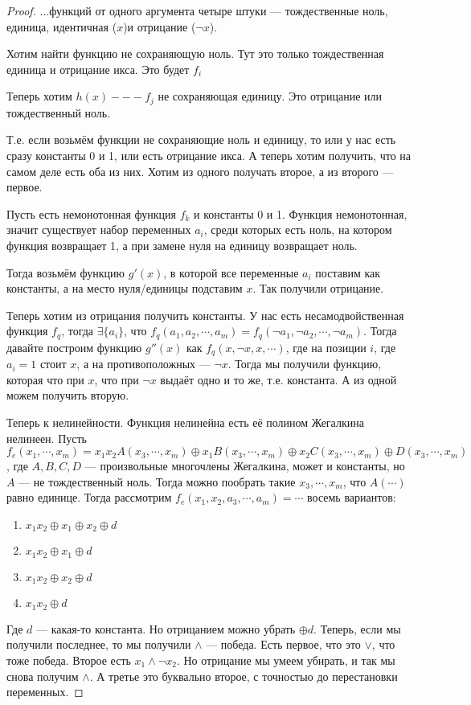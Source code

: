 \begin{proof}
	...функций от одного аргумента четыре штуки --- тождественные ноль, единица, идентичная ($x$)и отрицание ($\lnot x$).

	Хотим найти функцию не сохраняющую ноль. Тут это только тождественная единица и отрицание икса. Это будет $f_i$

	Теперь хотим $h(x) --- f_j$ не сохраняющая единицу. Это отрицание или тождественный ноль. 

	Т.е. если возьмём функции не сохраняющие ноль и единицу, то или у нас есть сразу константы 0 и 1, или есть отрицание икса.  А теперь хотим получить, что на самом деле есть оба из них. Хотим из одного получать второе, а из второго --- первое.

	Пусть есть немонотонная функция $f_k$ и константы 0 и 1. Функция немонотонная, значит существует набор переменных $a_i$, среди которых есть ноль, на котором функция возвращает 1, а при замене нуля на единицу возвращает ноль. 

	Тогда возьмём функцию $g'(x)$, в которой все переменные $a_i$ поставим как константы, а на место нуля/единицы подставим $x$. Так получили отрицание.

	Теперь хотим из отрицания получить константы. У нас есть несамодвойственная функция $f_q$, тогда $\exists \{a_i\}$, что $f_q(a_1, a_2, \cdots, a_m) = f_q(\lnot a_1, \lnot a_2, \cdots, \lnot a_m)$. Тогда давайте построим функцию $g''(x)$ как $f_q(x, \lnot x, x, \cdots)$, где на позиции $i$, где $a_i = 1$ стоит $x$, а на противоположных --- $\lnot x$. Тогда мы получили функцию, которая что при $x$, что при $\lnot x$ выдаёт одно и то же, т.е. константа. А из одной можем получить вторую.

	Теперь к нелинейности. Функция нелинейна есть её полином Жегалкина нелинеен. Пусть $f_e(x_1, \cdots, x_m) = x_1 x_2 A(x_3, \cdots, x_m) \oplus x_1 B(x_3, \cdots, x_m) \oplus x_2 C(x_3, \cdots, x_m) \oplus D(x_3, \cdots, x_m) $, где $A, B, C, D$ --- произвольные многочлены Жегалкина, может и константы, но $A$ --- не тождественный ноль. Тогда можно пообрать такие $x_3, \cdots, x_m$, что $A(\cdots)$ равно единице. Тогда рассмотрим $f_e(x_1, x_2, a_3, \cdots, a_m) = \cdots$ восемь вариантов: 

	\begin{enumerate}
		\item{$x_1 x_2 \oplus x_1 \oplus x_2 \oplus d$}
		\item{$x_1 x_2 \oplus x_1 \oplus d$}
		\item{$x_1 x_2 \oplus x_2 \oplus d$}
		\item{$x_1 x_2 \oplus d$}
	\end{enumerate}

	Где $d$ --- какая-то константа. Но отрицанием можно убрать $\oplus d$. Теперь, если мы получили последнее, то мы получили $\land$ --- победа. Есть первое, что это $\lor$, что тоже победа. Второе есть $x_1 \land \lnot x_2$. Но отрицание мы умеем убирать, и так мы снова получим $\land$. А третье это буквально второе, с точностью до перестановки переменных. 
\end{proof}

